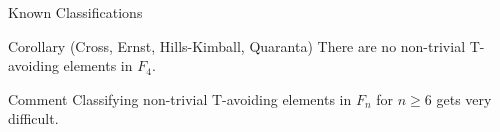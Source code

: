 \documentclass{beamer}
\newcommand\heapblock[4]{\fill[fill=#4, fill opacity=0.35, draw=#4, line width=1.1pt, rounded corners,shift={(\xxaxis:#1)},shift={(\yyaxis:#2)}] (-1,-1) rectangle (1,1);\node at (#1,#2) {\footnotesize $#3$};}
\newcommand\xxaxis{0}
\newcommand\yyaxis{90}
\begin{document}
\begin{frame}{Known Classifications}

\begin{block}{Corollary (Cross, Ernst, Hills-Kimball, Quaranta)}
There are no non-trivial T-avoiding elements in $F_4$.	
\end{block}
\pause

\begin{block}{Comment}
Classifying non-trivial T-avoiding elements in $F_n$ for $n \geq 6$ gets very difficult.	
\end{block}

\vspace{-1em}

\begin{figure}\centering
{}
\end{figure}


\end{frame}




%
%


\end{document}
